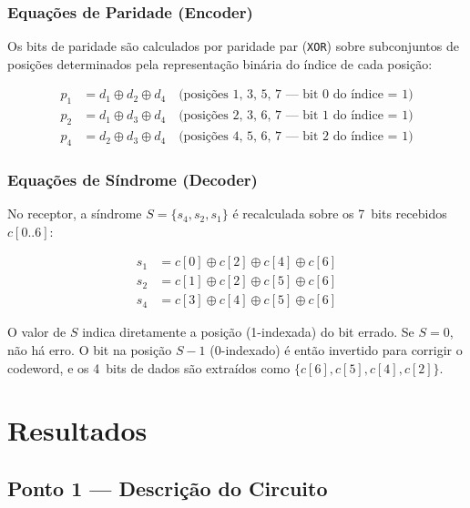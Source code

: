 \documentclass[12pt,a4paper]{article}
\begin{document}
\subsubsection{Equações de Paridade (Encoder)}

Os bits de paridade são calculados por paridade par (\texttt{XOR}) sobre subconjuntos de posições determinados pela representação binária do índice de cada posição:

\begin{align}
  p_1 &= d_1 \oplus d_2 \oplus d_4
        \quad\text{(posições 1, 3, 5, 7 --- bit~0 do índice = 1)} \label{eq:p1}\\
  p_2 &= d_1 \oplus d_3 \oplus d_4
        \quad\text{(posições 2, 3, 6, 7 --- bit~1 do índice = 1)} \label{eq:p2}\\
  p_4 &= d_2 \oplus d_3 \oplus d_4
        \quad\text{(posições 4, 5, 6, 7 --- bit~2 do índice = 1)} \label{eq:p4}
\end{align}

\subsubsection{Equações de Síndrome (Decoder)}

No receptor, a síndrome $S = \{s_4, s_2, s_1\}$ é recalculada sobre os 7~bits recebidos $c[0..6]$:

\begin{align}
  s_1 &= c[0] \oplus c[2] \oplus c[4] \oplus c[6] \label{eq:s1}\\
  s_2 &= c[1] \oplus c[2] \oplus c[5] \oplus c[6] \label{eq:s2}\\
  s_4 &= c[3] \oplus c[4] \oplus c[5] \oplus c[6] \label{eq:s4}
\end{align}

O valor de $S$ indica diretamente a posição (1-indexada) do bit errado. Se $S=0$, não há erro. O bit na posição $S-1$ (0-indexado) é então invertido para corrigir o codeword, e os 4~bits de dados são extraídos como $\{c[6], c[5], c[4], c[2]\}$.

\section{Resultados}

\subsection{Ponto 1 --- Descrição do Circuito}
\end{document}
